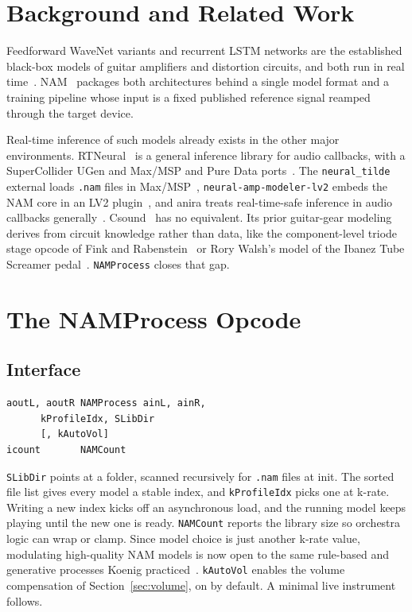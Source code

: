 \documentclass[runningheads,a4paper]{llncs}
\begin{document}
\section{Background and Related Work}

Feedforward WaveNet variants and recurrent LSTM networks are the
established black-box models of guitar amplifiers and distortion
circuits, and both run in real
time~\cite{damskagg2019tube,damskagg2019distortion,wright2019rnn,wright2020realtime,wright2020perceptual}.
NAM~\cite{atkinson2025slimmable,nam} packages both architectures behind
a single model format and a training pipeline whose input is a fixed
published reference signal reamped through the target device.

Real-time inference of such models already exists in the other major
environments. RTNeural~\cite{chowdhury2021rtneural} is a general
inference library for audio callbacks, with a SuperCollider UGen and
Max/MSP and Pure Data ports~\cite{pluta_rtneural}. The
\texttt{neural\_tilde} external loads \texttt{.nam} files in
Max/MSP~\cite{neuraltilde}, \texttt{neural-amp-modeler-lv2} embeds the
NAM core in an LV2 plugin~\cite{oliphantlv2}, and anira treats
real-time-safe inference in audio callbacks
generally~\cite{ackva2024anira}. Csound~\cite{lazzarini2016csound} has
no equivalent. Its prior guitar-gear modeling derives from circuit
knowledge rather than data, like the component-level triode stage opcode of
Fink and Rabenstein~\cite{fink2011triode} or Rory Walsh's model of the Ibanez Tube Screamer pedal~\cite{walsh2019tubescreamer}. \texttt{NAMProcess} closes that gap.

\section{The NAMProcess Opcode}
\label{sec:opcode}

\subsection{Interface}
\label{sec:interface}

\begin{verbatim}
aoutL, aoutR NAMProcess ainL, ainR,
      kProfileIdx, SLibDir
      [, kAutoVol]
icount       NAMCount
\end{verbatim}

\texttt{SLibDir} points at a folder, scanned recursively for
\texttt{.nam} files at init. The sorted file list gives every model a
stable index, and \texttt{kProfileIdx} picks one at k-rate. Writing a new index kicks off an asynchronous load, and the running model keeps playing until the new one is ready. \texttt{NAMCount} reports
the library size so orchestra logic can wrap or clamp. Since model
choice is just another k-rate value, modulating high-quality NAM models is now open to the same
rule-based and generative processes Koenig
practiced~\cite{koenig1970project2}.
\texttt{kAutoVol} enables the volume compensation of
Section~\ref{sec:volume}, on by default. A minimal live instrument follows.
\end{document}
